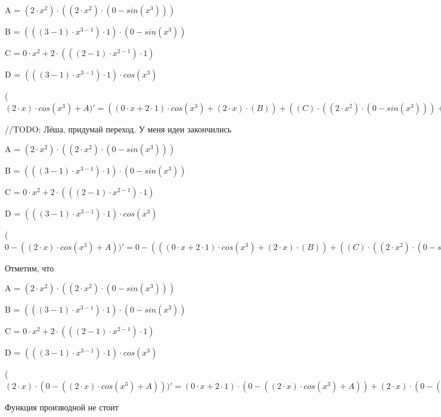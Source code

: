 \documentclass[12pt,a4paper,fleqn]{article}
\begin{document}
\begin{center}
A = $(2 \cdot x^{2}) \cdot ((2 \cdot x^{2}) \cdot (0-sin(x^{3})))$\end{center}
\begin{center}
B = $(((3-1) \cdot x^{3-1}) \cdot 1) \cdot (0-sin(x^{3}))$\end{center}
\begin{center}
C = $0 \cdot x^{2}+2 \cdot (((2-1) \cdot x^{2-1}) \cdot 1)$\end{center}
\begin{center}
D = $(((3-1) \cdot x^{3-1}) \cdot 1) \cdot cos(x^{3})$\end{center}
\begin{center}
 ($(2 \cdot x) \cdot cos(x^{3})+A)'
  = ((0 \cdot x+2 \cdot 1) \cdot cos(x^{3})+(2 \cdot x) \cdot (B))+((C) \cdot ((2 \cdot x^{2}) \cdot (0-sin(x^{3})))+(2 \cdot x^{2}) \cdot ((C) \cdot (0-sin(x^{3}))+(2 \cdot x^{2}) \cdot (0-D)))$\end{center}
//TODO: Лёша, придумай переход. У меня идеи закончились

\begin{center}
A = $(2 \cdot x^{2}) \cdot ((2 \cdot x^{2}) \cdot (0-sin(x^{3})))$\end{center}
\begin{center}
B = $(((3-1) \cdot x^{3-1}) \cdot 1) \cdot (0-sin(x^{3}))$\end{center}
\begin{center}
C = $0 \cdot x^{2}+2 \cdot (((2-1) \cdot x^{2-1}) \cdot 1)$\end{center}
\begin{center}
D = $(((3-1) \cdot x^{3-1}) \cdot 1) \cdot cos(x^{3})$\end{center}
\begin{center}
 ($0-((2 \cdot x) \cdot cos(x^{3})+A))'
  = 0-(((0 \cdot x+2 \cdot 1) \cdot cos(x^{3})+(2 \cdot x) \cdot (B))+((C) \cdot ((2 \cdot x^{2}) \cdot (0-sin(x^{3})))+(2 \cdot x^{2}) \cdot ((C) \cdot (0-sin(x^{3}))+(2 \cdot x^{2}) \cdot (0-D))))$\end{center}
Отметим, что

\begin{center}
A = $(2 \cdot x^{2}) \cdot ((2 \cdot x^{2}) \cdot (0-sin(x^{3})))$\end{center}
\begin{center}
B = $(((3-1) \cdot x^{3-1}) \cdot 1) \cdot (0-sin(x^{3}))$\end{center}
\begin{center}
C = $0 \cdot x^{2}+2 \cdot (((2-1) \cdot x^{2-1}) \cdot 1)$\end{center}
\begin{center}
D = $(((3-1) \cdot x^{3-1}) \cdot 1) \cdot cos(x^{3})$\end{center}
\begin{center}
 ($(2 \cdot x) \cdot (0-((2 \cdot x) \cdot cos(x^{3})+A)))'
  = (0 \cdot x+2 \cdot 1) \cdot (0-((2 \cdot x) \cdot cos(x^{3})+A))+(2 \cdot x) \cdot (0-(((0 \cdot x+2 \cdot 1) \cdot cos(x^{3})+(2 \cdot x) \cdot (B))+((C) \cdot ((2 \cdot x^{2}) \cdot (0-sin(x^{3})))+(2 \cdot x^{2}) \cdot ((C) \cdot (0-sin(x^{3}))+(2 \cdot x^{2}) \cdot (0-D)))))$\end{center}
Функция производной не стоит\cite{link2}
\end{document}
